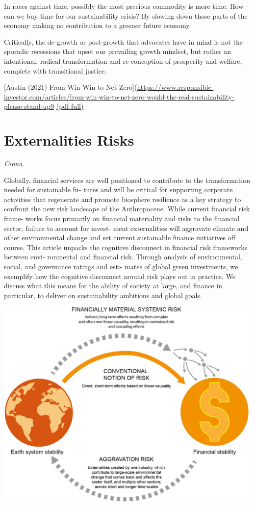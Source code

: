 \documentclass[
]{book}
\begin{document}
In races against time, possibly the most precious commodity is more time. How can we buy time for our sustainability crisis? By slowing down those parts of the economy making no contribution to a greener future economy.

Critically, the de-growth or post-growth that advocates have in mind is not the sporadic recessions that upset our prevailing growth mindset, but rather an intentional, radical transformation and re-conception of prosperity and welfare, complete with transitional justice.

{[}Austin (2021) From Win-Win to Net-Zero{]}(\url{https://www.responsible-investor.com/articles/from-win-win-to-net-zero-would-the-real-sustainability-please-stand-up9}
\href{pdf/Austin_2021_Win-Win_Net-Zero.pdf}{(pdf full)}

\hypertarget{externalities-risks}{%
\section{Externalities Risks}\label{externalities-risks}}

\emph{Crona}

Globally, financial services are well positioned to contribute to the transformation needed for sustainable fu-
tures and will be critical for supporting corporate activities that regenerate and promote biosphere resilience
as a key strategy to confront the new risk landscape of the Anthropocene. While current financial risk frame-
works focus primarily on financial materiality and risks to the financial sector, failure to account for invest-
ment externalities will aggravate climate and other environmental change and set current sustainable finance
initiatives off course. This article unpacks the cognitive disconnect in financial risk frameworks between envi-
ronmental and financial risk. Through analysis of environmental, social, and governance ratings and esti-
mates of global green investments, we exemplify how the cognitive disconnect around risk plays out in
practice. We discuss what this means for the ability of society at large, and finance in particular, to deliver
on sustainability ambitions and global goals.

\includegraphics{fig/externalities_risks.png}
\end{document}
